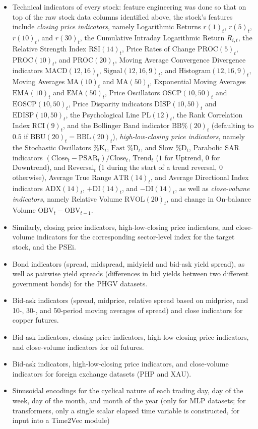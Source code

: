 \documentclass[stu,floatsintext]{apa7}
\begin{document}
\begin{itemize}
\item Technical indicators of every stock: feature engineering was done so that on top of the raw stock data columns identified above, the stock's features include \textit{closing price indicators}, namely Logarithmic Returns $r(1)_t$, $r(5)_t$, $r(10)_t$, and $r(30)_t$, the Cumulative Intraday Logarithmic Return $R_{i,t}$, the Relative Strength Index $\text{RSI}(14)_t$, Price Rates of Change $\text{PROC}(5)_t$, $\text{PROC}(10)_t$, and $\text{PROC}(20)_t$, Moving Average Convergence Divergence indicators $\text{MACD}(12,16)_t$, $\text{Signal}(12,16,9)_t$, and $\text{Histogram}(12,16,9)_t$, Moving Averages $\text{MA}(10)_t$ and $\text{MA}(50)_t$, Exponential Moving Averages $\text{EMA}(10)_t$ and $\text{EMA}(50)_t$, Price Oscillators $\text{OSCP}(10,50)_t$ and $\text{EOSCP}(10,50)_t$, Price Disparity indicators $\text{DISP}(10,50)_t$ and $\text{EDISP}(10,50)_t$, the Psychological Line $\text{PL}(12)_t$, the Rank Correlation Index $\text{RCI}(9)_t$, and the Bollinger Band indicator $\text{BB\%}(20)_t$ (defaulting to $0.5$ if $\text{BBU}(20)_t=\text{BBL}(20)_t$), \textit{high-low-closing price indicators}, namely the Stochastic Oscillators $\text{\%K}_t$, $\text{Fast \%D}_t$, and $\text{Slow \%D}_t$, Parabolic SAR indicators $(\text{Close}_t-\text{PSAR}_t) / \text{Close}_t$, $\text{Trend}_t$ ($1$ for $\text{Uptrend}$, $0$ for $\text{Downtrend}$), and $\text{Reversal}_t$ ($1$ during the start of a trend reversal, $0$ otherwise), Average True Range $\text{ATR}(14)_t$, and Average Directional Index indicators $\text{ADX}(14)_t$, $+\text{DI}(14)_t$, and $-\text{DI}(14)_t$, as well as \textit{close-volume indicators}, namely Relative Volume $\text{RVOL}(20)_t$, and change in On-balance Volume $\text{OBV}_t-\text{OBV}_{t-1}$.
\item Similarly, closing price indicators, high-low-closing price indicators, and close-volume indicators for the corresponding sector-level index for the target stock, and the PSEi.
\item Bond indicators (spread, midspread, midyield and bid-ask yield spread), as well as pairwise yield spreads (differences in bid yields between two different government bonds) for the PHGV datasets.
\item Bid-ask indicators (spread, midprice, relative spread based on midprice, and 10-, 30-, and 50-period moving averages of spread) and close indicators for copper futures.
\item Bid-ask indicators, closing price indicators, high-low-closing price indicators, and close-volume indicators for oil futures.
\item Bid-ask indicators, high-low-closing price indicators, and close-volume indicators for foreign exchange datasets (PHP and XAU).
\item Sinusoidal encodings for the cyclical nature of each trading day, day of the week, day of the month, and month of the year (only for MLP datasets; for transformers, only a single scalar elapsed time variable is constructed, for input into a Time2Vec module)
\end{itemize}
\end{document}
